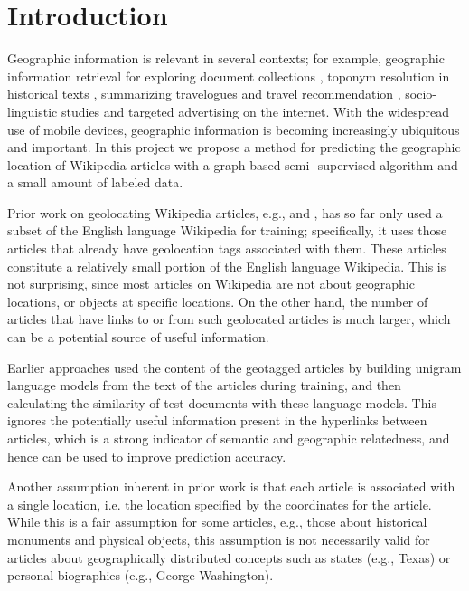 \section{Introduction}

Geographic information is relevant in several contexts; for example,
geographic information retrieval for exploring document collections
\cite{ding2000computing}, toponym resolution in historical texts
\cite{smith2001disambiguating}, summarizing travelogues and travel
recommendation \cite{hao-et-al:10}, socio-linguistic studies \cite{eisenstein-
smith-xing:11} and targeted advertising on the internet.  With the widespread
use of mobile devices, geographic information is becoming increasingly
ubiquitous and important.  In this project we propose a method for predicting
the geographic location of Wikipedia articles with a graph based semi-
supervised algorithm and a small amount of labeled data.

\par Prior work on geolocating Wikipedia articles, e.g., \cite{wing-
baldridge:11} and  \cite{rolleretal:12}, has so far only used a subset of the
English language Wikipedia for training; specifically, it uses those articles
that already have geolocation tags associated with them.  These articles
constitute a relatively small portion of the English language Wikipedia.
  This is not surprising, since most articles on
Wikipedia are not about geographic locations, or objects at specific
locations. On the other hand, the number of articles that have links to or
from such geolocated articles is much larger, which can be a potential source
of useful information. 

\par Earlier approaches used the content of the geotagged articles by building
unigram language models from the text of the articles during training, and
then calculating the similarity of test documents with these language models.
This ignores the potentially useful information present in the hyperlinks
between articles, which is a strong indicator of semantic and geographic
relatedness, and hence can be used to improve prediction accuracy.

\par Another assumption inherent in prior work is that each article is
associated with a single location, i.e. the location specified by the
coordinates for the article. While this is a fair assumption for some
articles, e.g., those about historical monuments and physical objects, this
assumption is not necessarily valid for articles about geographically
distributed concepts such as states (e.g., Texas) or personal biographies
(e.g., George Washington).

